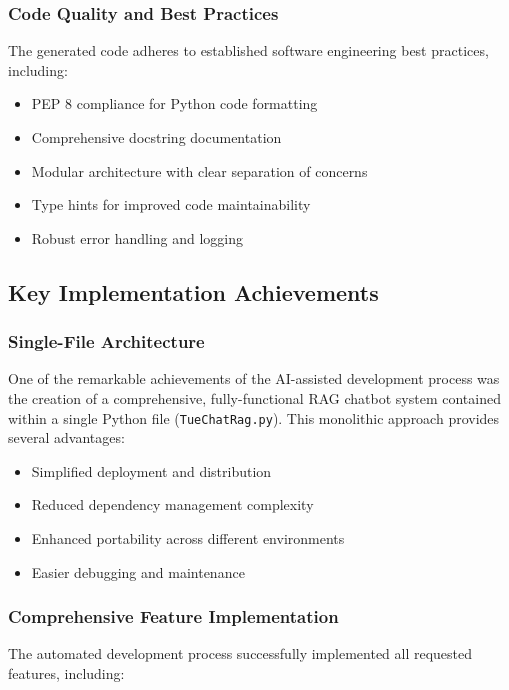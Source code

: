 \documentclass[12pt,letterpaper]{article}
\begin{document}
\subsubsection{Code Quality and Best Practices}

The generated code adheres to established software engineering best practices, including:

\begin{itemize}
    \item PEP 8 compliance for Python code formatting
    \item Comprehensive docstring documentation
    \item Modular architecture with clear separation of concerns
    \item Type hints for improved code maintainability
    \item Robust error handling and logging
\end{itemize}

\subsection{Key Implementation Achievements}

\subsubsection{Single-File Architecture}

One of the remarkable achievements of the AI-assisted development process was the creation of a comprehensive, fully-functional RAG chatbot system contained within a single Python file (\texttt{TueChatRag.py}). This monolithic approach provides several advantages:

\begin{itemize}
    \item Simplified deployment and distribution
    \item Reduced dependency management complexity
    \item Enhanced portability across different environments
    \item Easier debugging and maintenance
\end{itemize}

\subsubsection{Comprehensive Feature Implementation}

The automated development process successfully implemented all requested features, including:
\end{document}
